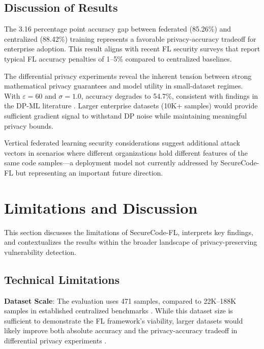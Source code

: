 \documentclass[pdflatex,sn-mathphys-num]{sn-jnl}
\theoremstyle{thmstyleone}%
\theoremstyle{thmstyletwo}%
\theoremstyle{thmstylethree}%
\begin{document}
\FloatBarrier

\subsection{Discussion of Results}\label{subsec:discussion}

The 3.16 percentage point accuracy gap between federated (85.26\%) and centralized (88.42\%) training represents a favorable privacy-accuracy tradeoff for enterprise adoption. This result aligns with recent FL security surveys \cite{gao2024federated, nguyen2024flsecurity} that report typical FL accuracy penalties of 1--5\% compared to centralized baselines.

The differential privacy experiments reveal the inherent tension between strong mathematical privacy guarantees and model utility in small-dataset regimes. With $\varepsilon=60$ and $\sigma=1.0$, accuracy degrades to 54.7\%, consistent with findings in the DP-ML literature \cite{zhang2024dpml, abadi2024dpsgd}. Larger enterprise datasets (10K+ samples) would provide sufficient gradient signal to withstand DP noise while maintaining meaningful privacy bounds.

Vertical federated learning security considerations \cite{wang2024vflsecurity} suggest additional attack vectors in scenarios where different organizations hold different features of the same code samples---a deployment model not currently addressed by SecureCode-FL but representing an important future direction.


\section{Limitations and Discussion}\label{sec:limitations}

This section discusses the limitations of SecureCode-FL, interprets key findings, and contextualizes the results within the broader landscape of privacy-preserving vulnerability detection.

\subsection{Technical Limitations}\label{subsec:tech_limitations}

\textbf{Dataset Scale}: The evaluation uses 471 samples, compared to 22K--188K samples in established centralized benchmarks \cite{zhou2019devign, li2018vuldeepecker}. While this dataset size is sufficient to demonstrate the FL framework's viability, larger datasets would likely improve both absolute accuracy and the privacy-accuracy tradeoff in differential privacy experiments \cite{zhang2024dpml}.
\end{document}
